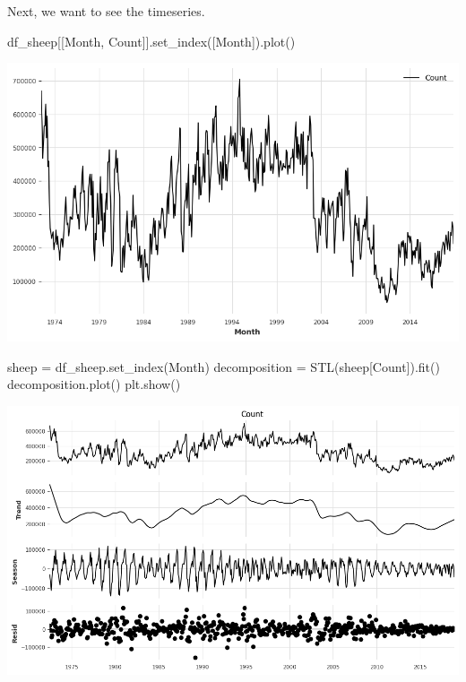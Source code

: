 \documentclass[
  11pt,
]{article}
\newenvironment{Shaded}{\begin{snugshade}}{\end{snugshade}}
\newcommand{\NormalTok}[1]{\textcolor[rgb]{0.00,0.23,0.31}{#1}}
\newcommand{\OperatorTok}[1]{\textcolor[rgb]{0.37,0.37,0.37}{#1}}
\newcommand{\StringTok}[1]{\textcolor[rgb]{0.13,0.47,0.30}{#1}}
\begin{document}
Next, we want to see the timeseries.

\begin{Shaded}
\begin{Highlighting}[]
\NormalTok{df\_sheep[[}\StringTok{\textquotesingle{}Month\textquotesingle{}}\NormalTok{, }\StringTok{\textquotesingle{}Count\textquotesingle{}}\NormalTok{]].set\_index([}\StringTok{\textquotesingle{}Month\textquotesingle{}}\NormalTok{]).plot()}
\end{Highlighting}
\end{Shaded}

\includegraphics{hw3_files/figure-pdf/cell-17-output-1.png}

\begin{Shaded}
\begin{Highlighting}[]
\NormalTok{sheep }\OperatorTok{=}\NormalTok{ df\_sheep.set\_index(}\StringTok{\textquotesingle{}Month\textquotesingle{}}\NormalTok{)}
\NormalTok{decomposition }\OperatorTok{=}\NormalTok{ STL(sheep[}\StringTok{\textquotesingle{}Count\textquotesingle{}}\NormalTok{]).fit()}
\NormalTok{decomposition.plot()}
\NormalTok{plt.show()}
\end{Highlighting}
\end{Shaded}

\includegraphics{hw3_files/figure-pdf/cell-18-output-1.png}
\end{document}
